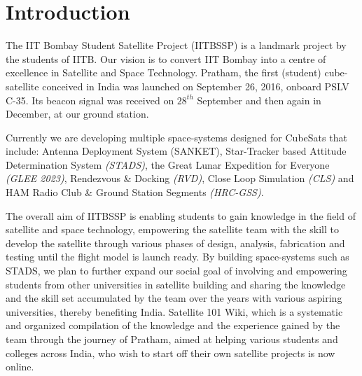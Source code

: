 \documentclass[../../main.tex]{subfiles}
\begin{document}
\chapter{Introduction}
\thispagestyle{fancy}
The IIT Bombay Student Satellite Project (IITBSSP) is a landmark project by the students of IITB. Our vision is to convert IIT Bombay into a centre of excellence in Satellite and Space Technology. Pratham, the first (student) cube-satellite conceived in India was launched on September 26, 2016, onboard PSLV C-35. Its beacon signal was received on $28^{th}$ September and then again in December, at our ground station.

Currently we are developing multiple space-systems designed for CubeSats that include: Antenna Deployment System (SANKET), Star-Tracker based Attitude Determination System \emph{(STADS)}, the Great Lunar Expedition for Everyone \emph{(GLEE 2023)}, Rendezvous \& Docking \emph{(RVD)}, Close Loop Simulation \emph{(CLS)} and HAM Radio Club \& Ground Station Segments \emph{(HRC-GSS)}.

The overall aim of IITBSSP is enabling students to gain knowledge in the field of satellite and space technology, empowering the satellite team with the skill to develop the satellite through various phases of design, analysis, fabrication and testing until the flight model is launch ready. By building space-systems such as STADS, we plan to further expand our social goal of involving and empowering students from other universities in satellite building and sharing the knowledge and the skill set accumulated by the team over the years with various aspiring universities, thereby benefiting India. Satellite 101 Wiki, which is a systematic and organized compilation of the knowledge and the experience gained by the team through the journey of Pratham, aimed at helping various students and colleges across India, who wish to start off their own satellite projects is now online.
\end{document}
